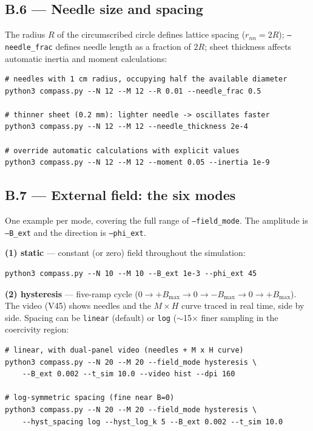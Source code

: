 \documentclass[11pt,a4paper]{article}
\newcommand{\code}[1]{\texttt{#1}}
\begin{document}
\subsection*{B.6 --- Needle size and spacing}

The radius $R$ of the circumscribed circle defines lattice spacing ($r_{nn} = 2R$); \code{--needle\_frac} defines needle length as a fraction of $2R$; sheet thickness affects automatic inertia and moment calculations:
\begin{verbatim}
# needles with 1 cm radius, occupying half the available diameter
python3 compass.py --N 12 --M 12 --R 0.01 --needle_frac 0.5

# thinner sheet (0.2 mm): lighter needle -> oscillates faster
python3 compass.py --N 12 --M 12 --needle_thickness 2e-4

# override automatic calculations with explicit values
python3 compass.py --N 12 --M 12 --moment 0.05 --inertia 1e-9
\end{verbatim}

\subsection*{B.7 --- External field: the six modes}

One example per mode, covering the full range of \code{--field\_mode}. The amplitude is \code{--B\_ext} and the direction is \code{--phi\_ext}.

\medskip\noindent\textbf{(1) static} --- constant (or zero) field throughout the simulation:
\begin{verbatim}
python3 compass.py --N 10 --M 10 --B_ext 1e-3 --phi_ext 45
\end{verbatim}

\noindent\textbf{(2) hysteresis} --- five-ramp cycle ($0 \to +B_{\max} \to 0 \to -B_{\max} \to 0 \to +B_{\max}$). The video (V45) shows needles and the $M\times H$ curve traced in real time, side by side. Spacing can be \code{linear} (default) or \code{log} ($\sim$15$\times$ finer sampling in the coercivity region:
\begin{verbatim}
# linear, with dual-panel video (needles + M x H curve)
python3 compass.py --N 20 --M 20 --field_mode hysteresis \
    --B_ext 0.002 --t_sim 10.0 --video hist --dpi 160

# log-symmetric spacing (fine near B=0)
python3 compass.py --N 20 --M 20 --field_mode hysteresis \
    --hyst_spacing log --hyst_log_k 5 --B_ext 0.002 --t_sim 10.0
\end{verbatim}
\end{document}
